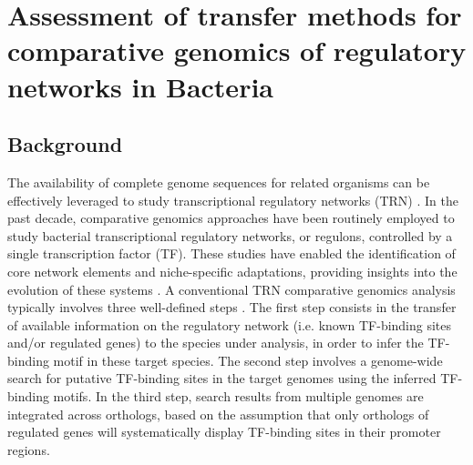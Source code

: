 
\chapter{Assessment of transfer methods for comparative genomics of regulatory
networks in Bacteria }

\section{Background}

The availability of complete genome sequences for related organisms can be
effectively leveraged to study transcriptional regulatory networks (TRN)
\cite{babu2008computational}. In the past decade, comparative genomics
approaches have been routinely employed to study bacterial transcriptional
regulatory networks, or regulons, controlled by a single transcription factor
(TF). These studies have enabled the identification of core network elements
and niche-specific adaptations, providing insights into the evolution of these
systems \cite{tan2001comparative, makarova2001conservation,
  erill2004differences, venancio2009reconstructing, baumbach2010power,
  rodionov2013transcriptional}. A conventional TRN comparative genomics
analysis typically involves three well-defined steps
\cite{babu2008computational, gelfand2000comparative, baumbach2009reliable}. The
first step consists in the transfer of available information on the regulatory
network (i.e. known TF-binding sites and/or regulated genes) to the species
under analysis, in order to infer the TF-binding motif in these target
species. The second step involves a genome-wide search for putative TF-binding
sites in the target genomes using the inferred TF-binding motifs. In the third
step, search results from multiple genomes are integrated across orthologs,
based on the assumption that only orthologs of regulated genes will
systematically display TF-binding sites in their promoter regions.

